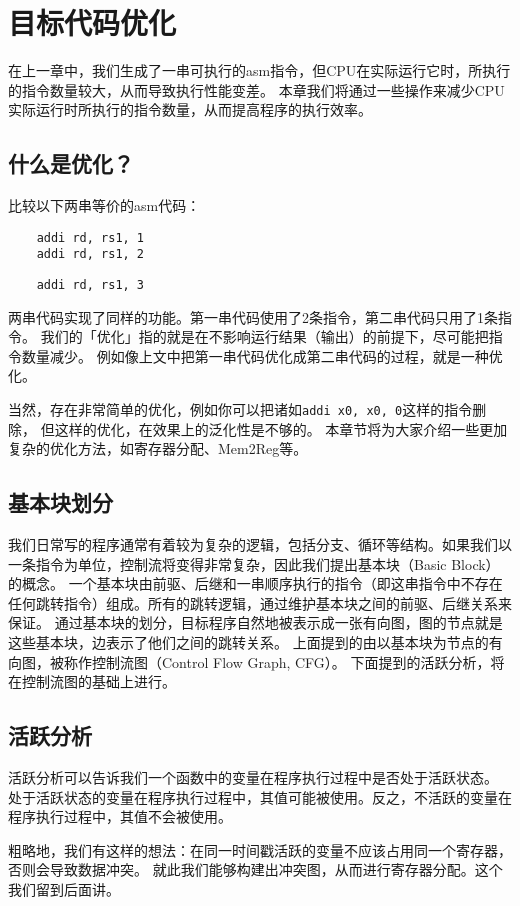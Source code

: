 \chapter{目标代码优化}

\label{chap:optimize}
在上一章中，我们生成了一串可执行的asm指令，但CPU在实际运行它时，所执行的指令数量较大，从而导致执行性能变差。
本章我们将通过一些操作来减少CPU实际运行时所执行的指令数量，从而提高程序的执行效率。
\section{什么是优化？}
比较以下两串等价的asm代码：
\begin{lstlisting}
    addi rd, rs1, 1
    addi rd, rs1, 2
    \end{lstlisting}
\begin{lstlisting}  
    addi rd, rs1, 3
\end{lstlisting}

两串代码实现了同样的功能。第一串代码使用了2条指令，第二串代码只用了1条指令。
我们的「优化」指的就是在不影响运行结果（输出）的前提下，尽可能把指令数量减少。
例如像上文中把第一串代码优化成第二串代码的过程，就是一种优化。

当然，存在非常简单的优化，例如你可以把诸如\texttt{addi x0, x0, 0}这样的指令删除，
但这样的优化，在效果上的泛化性是不够的。
本章节将为大家介绍一些更加复杂的优化方法，如寄存器分配、Mem2Reg等。
\section{基本块划分}
我们日常写的程序通常有着较为复杂的逻辑，包括分支、循环等结构。如果我们以一条指令为单位，控制流将变得非常复杂，因此我们提出基本块（Basic Block）的概念。
一个基本块由前驱、后继和一串顺序执行的指令（即这串指令中不存在任何跳转指令）组成。所有的跳转逻辑，通过维护基本块之间的前驱、后继关系来保证。
通过基本块的划分，目标程序自然地被表示成一张有向图，图的节点就是这些基本块，边表示了他们之间的跳转关系。
上面提到的由以基本块为节点的有向图，被称作控制流图（Control Flow Graph, CFG）。
下面提到的活跃分析，将在控制流图的基础上进行。


\section{活跃分析}
活跃分析可以告诉我们一个函数中的变量在程序执行过程中是否处于活跃状态。
处于活跃状态的变量在程序执行过程中，其值可能被使用。反之，不活跃的变量在程序执行过程中，其值不会被使用。

粗略地，我们有这样的想法：在同一时间戳活跃的变量不应该占用同一个寄存器，否则会导致数据冲突。
就此我们能够构建出冲突图，从而进行寄存器分配。这个我们留到后面讲。

